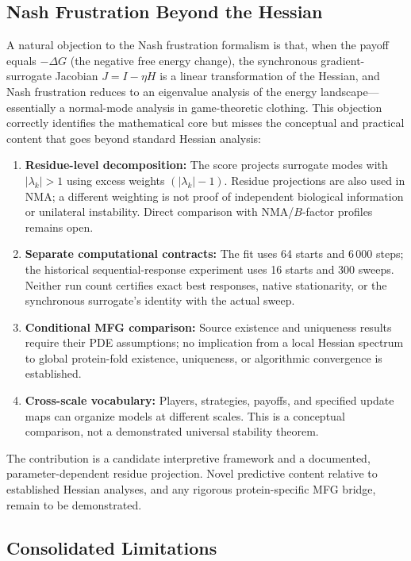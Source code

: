 \documentclass[12pt,a4paper]{article}
\theoremstyle{remark}
\begin{document}
\subsection{Nash Frustration Beyond the Hessian}

A natural objection to the Nash frustration formalism is that, when the payoff equals $-\Delta G$ (the negative free energy change), the synchronous gradient-surrogate Jacobian $J = I - \eta H$ is a linear transformation of the Hessian, and Nash frustration reduces to an eigenvalue analysis of the energy landscape---essentially a normal-mode analysis in game-theoretic clothing. This objection correctly identifies the mathematical core but misses the conceptual and practical content that goes beyond standard Hessian analysis:

\begin{enumerate}
    \item \textbf{Residue-level decomposition:} The score projects surrogate modes with $|\lambda_k|>1$ using excess weights $(|\lambda_k|-1)$. Residue projections are also used in NMA; a different weighting is not proof of independent biological information or unilateral instability. Direct comparison with NMA/$B$-factor profiles remains open.
    \item \textbf{Separate computational contracts:} The fit uses 64 starts and 6\,000 steps; the historical sequential-response experiment uses 16 starts and 300 sweeps. Neither run count certifies exact best responses, native stationarity, or the synchronous surrogate's identity with the actual sweep.
    \item \textbf{Conditional MFG comparison:} Source existence and uniqueness results require their PDE assumptions; no implication from a local Hessian spectrum to global protein-fold existence, uniqueness, or algorithmic convergence is established.
    \item \textbf{Cross-scale vocabulary:} Players, strategies, payoffs, and specified update maps can organize models at different scales. This is a conceptual comparison, not a demonstrated universal stability theorem.
\end{enumerate}

\noindent The contribution is a candidate interpretive framework and a documented, parameter-dependent residue projection. Novel predictive content relative to established Hessian analyses, and any rigorous protein-specific MFG bridge, remain to be demonstrated.

\subsection{Consolidated Limitations}
\end{document}
